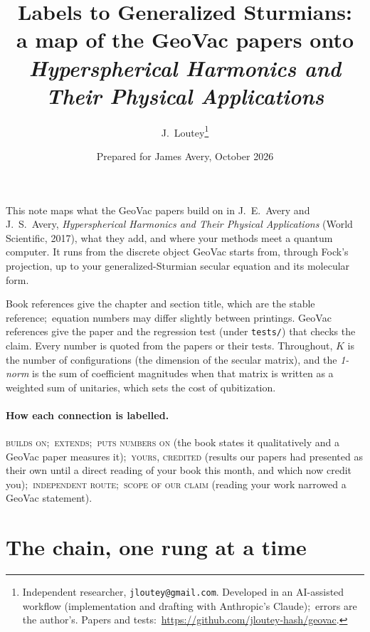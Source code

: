 \documentclass[11pt]{article}
\title{Labels to Generalized Sturmians:\\ a map of the GeoVac papers onto
\emph{Hyperspherical Harmonics and Their Physical Applications}}
\author{J.~Loutey\thanks{Independent researcher,
\texttt{jloutey@gmail.com}. Developed in an AI-assisted workflow
(implementation and drafting with Anthropic's Claude);\ errors are the
author's. Papers and tests:\
\url{https://github.com/jloutey-hash/geovac}.}}
\date{Prepared for James Avery, October 2026}
\newcommand{\rel}[1]{\textsc{#1}}
\begin{document}
\maketitle

\noindent This note maps what the GeoVac papers build on in
J.~E.~Avery and J.~S.~Avery, \emph{Hyperspherical Harmonics and Their
Physical Applications} (World Scientific, 2017), what they add, and where
your methods meet a quantum computer. It runs from the discrete object
GeoVac starts from, through Fock's projection, up to your
generalized-Sturmian secular equation and its molecular form.

Book references give the chapter and section title, which are the stable
reference;\ equation numbers may differ slightly between printings. GeoVac references give
the paper and the regression test (under \texttt{tests/}) that checks the
claim. Every number is quoted from the papers or their tests. Throughout,
$K$ is the number of configurations (the dimension of the secular matrix),
and the \emph{1-norm} is the sum of coefficient magnitudes when that matrix
is written as a weighted sum of unitaries, which sets the cost of
qubitization.

\paragraph{How each connection is labelled.}
\rel{builds on};\ \rel{extends};\ \rel{puts numbers on} (the book states
it qualitatively and a GeoVac paper measures it);\ \rel{yours, credited}
(results our papers had presented as their own until a direct reading of
your book this month, and which now credit you);\ \rel{independent route};\
\rel{scope of our claim} (reading your work narrowed a GeoVac statement).

\section{The chain, one rung at a time}
\end{document}
